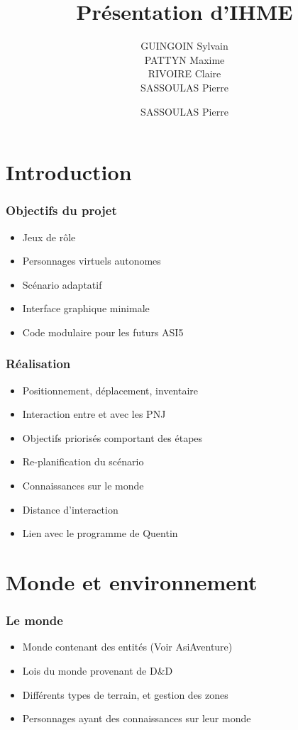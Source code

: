 \documentclass{beamer}
\title{Présentation d'IHME}
\author{GUINGOIN Sylvain \\PATTYN Maxime \\RIVOIRE Claire \\SASSOULAS Pierre}
\newcommand{\cmark}{\ding{51}}
\newcommand{\xmark}{\ding{55}}
\begin{document}
\frame{\titlepage}
\author{}
\frame{\tableofcontents}

\author{SASSOULAS Pierre}
\section{Introduction}
\begin{frame}
  \frametitle{Objectifs du projet}
    \begin{itemize}
        \item Jeux de rôle
        \item Personnages virtuels autonomes
        \item Scénario adaptatif 
        \item Interface graphique minimale
        \item Code modulaire pour les futurs ASI5
    \end{itemize} 
\end{frame}

\begin{frame}
  \frametitle{Réalisation}
    \begin{itemize}
        \item Positionnement, déplacement, inventaire \only<2>{\textcolor{vertFleche}{\LARGE \cmark{}}  \textit{\small} }
        \item Interaction entre et avec les PNJ \only<2>{\textcolor{vertFleche}{\LARGE \cmark{}} \textit{\small }}
        \item Objectifs priorisés comportant des étapes \only<2>{\textcolor{vertFleche}{\LARGE \cmark{}} \textit{\small }}
        \item Re-planification du scénario \only<2>{\textcolor{vertFleche}{\LARGE \cmark{}} \textit{\small }}
        \item Connaissances sur le monde \only<2>{\textcolor{vertFleche}{\LARGE \cmark{}} \textit{\small }}
        \item Distance d'interaction  \only<2>{\textcolor{red}{\LARGE \xmark{}} \textit{\small }}
        \item Lien avec le programme de Quentin \only<2>{\textcolor{red}{\LARGE \xmark{}} \textit{\small }}
    \end{itemize} 
\end{frame}

\section{Monde et environnement}
\begin{frame}
    \frametitle{Le monde}
    \begin{itemize}
        \item Monde contenant des entités (Voir AsiAventure)
        \item Lois du monde provenant de D\&D
        \item Différents types de terrain, et gestion des zones
        \item Personnages ayant des connaissances sur leur monde
    \end{itemize} 
\end{frame}
\end{document}
